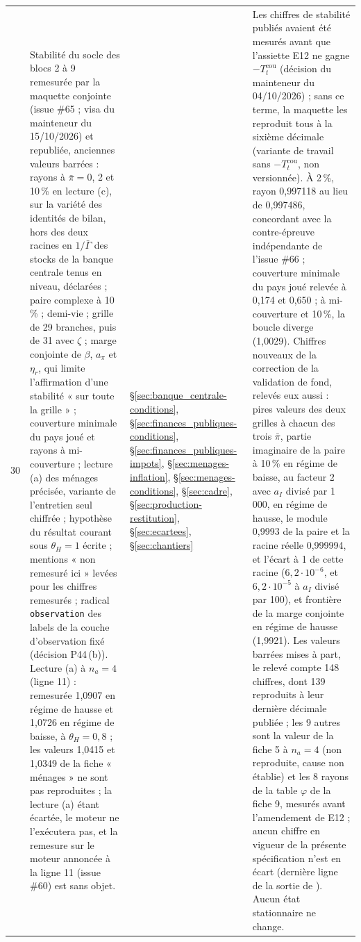 \documentclass[11pt,a4paper]{article}
\newcommand{\code}[1]{\texttt{\detokenize{#1}}}
\begin{document}
\begin{center}
\begin{longtable}{p{0.5cm}>{\raggedright\arraybackslash}p{6.3cm}>{\raggedright\arraybackslash}p{2.1cm}>{\raggedright\arraybackslash}p{5.8cm}}
30 & Stabilité du socle des blocs 2 à 9 remesurée par la maquette conjointe \code{outils/maquette_conjointe.py} (issue \#65 ; visa du mainteneur du 15/10/2026) et republiée, anciennes valeurs barrées : rayons à $\bar\pi = 0$, 2 et 10\,\% en lecture (c), sur la variété des identités de bilan, hors des deux racines en $1/\bar\Gamma$ des stocks de la banque centrale tenus en niveau, déclarées ; paire complexe à 10\,\% ; demi-vie ; grille de 29 branches, puis de 31 avec $\zeta$ ; marge conjointe de $\beta$, $a_\pi$ et $\eta_r$, qui limite l'affirmation d'une stabilité « sur toute la grille » ; couverture minimale du pays joué et rayons à mi-couverture ; lecture (a) des ménages précisée, variante de l'entretien seul chiffrée ; hypothèse du résultat courant sous $\theta_H = 1$ écrite ; mentions « non remesuré ici » levées pour les chiffres remesurés ; radical \texttt{observation} des labels de la couche d'observation fixé (décision P44\,(b)). Lecture (a) à $n_a = 4$ (ligne 11) : remesurée 1,0907 en régime de hausse et 1,0726 en régime de baisse, à $\theta_H = 0{,}8$ ; les valeurs 1,0415 et 1,0349 de la fiche « ménages » ne sont pas reproduites ; la lecture (a) étant écartée, le moteur ne l'exécutera pas, et la remesure sur le moteur annoncée à la ligne 11 (issue \#60) est sans objet. & \S\ref{sec:banque_centrale-conditions}, \S\ref{sec:finances_publiques-conditions}, \S\ref{sec:finances_publiques-impots}, \S\ref{sec:menages-inflation}, \S\ref{sec:menages-conditions}, \S\ref{sec:cadre}, \S\ref{sec:production-restitution}, \S\ref{sec:ecartees}, \S\ref{sec:chantiers} & Les chiffres de stabilité publiés avaient été mesurés avant que l'assiette E12 ne gagne $-T^{\mathrm{cou}}_t$ (décision du mainteneur du 04/10/2026) ; sans ce terme, la maquette les reproduit tous à la sixième décimale (variante de travail sans $-T^{\mathrm{cou}}_t$, non versionnée). À 2\,\%, rayon 0,997118 au lieu de 0,997486, concordant avec la contre-épreuve indépendante de l'issue \#66 ; couverture minimale du pays joué relevée à 0,174 et 0,650 ; à mi-couverture et 10\,\%, la boucle diverge (1,0029). Chiffres nouveaux de la correction de la validation de fond, relevés eux aussi : pires valeurs des deux grilles à chacun des trois $\bar\pi$, partie imaginaire de la paire à 10\,\% en régime de baisse, au facteur 2 avec $a_I$ divisé par 1\,000, en régime de hausse, le module 0,9993 de la paire et la racine réelle 0,999994, et l'écart à 1 de cette racine ($6{,}2\cdot10^{-6}$, et $6{,}2\cdot10^{-5}$ à $a_I$ divisé par 100), et frontière de la marge conjointe en régime de hausse (1,9921). Les valeurs barrées mises à part, le relevé compte 148 chiffres, dont 139 reproduits à leur dernière décimale publiée ; les 9 autres sont la valeur de la fiche 5 à $n_a = 4$ (non reproduite, cause non établie) et les 8 rayons de la table $\varphi$ de la fiche 9, mesurés avant l'amendement de E12 ; aucun chiffre en vigueur de la présente spécification n'est en écart (dernière ligne de la sortie de \code{outils/maquette_conjointe.py}). Aucun état stationnaire ne change.\\

\end{longtable}
\end{center}
\end{document}
